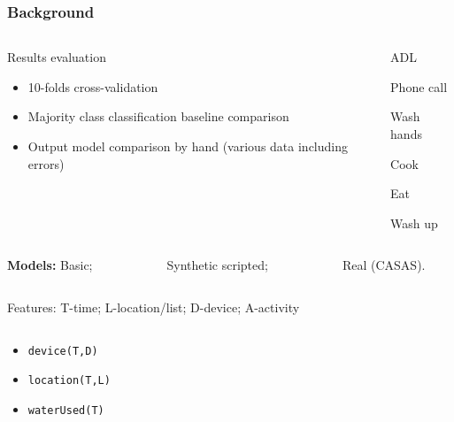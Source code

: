 \documentclass[10pt]{beamer}
\begin{document}
\begin{frame}
  \frametitle{Background}

  \begin{columns}
    \begin{column}{8cm}
      \begin{block}{Results evaluation}
      \begin{itemize}
        \item 10-folds cross-validation
        \item Majority class classification baseline comparison
        \item Output model comparison by hand (various data including errors)
      \end{itemize}
      \end{block}
    \end{column}

    \begin{column}{3cm}
      \begin{block}{ADL}
      \begin{itemize}
        \item Phone call
        \item Wash hands
        \item Cook {\setlength{\itemindent}{4em}\vspace*{-1.5em}\item Eat}
        \item Wash up
      \end{itemize}
      \end{block}
    \end{column}
  \end{columns}

\vspace*{0.5em}\textbf{Models:} Basic;~~~~~~~~~~~~Synthetic scripted;~~~~~~~~~~~~Real (CASAS).

  \begin{columns}

    \begin{column}{8cm}
      \begin{block}{Features: T-time; L-location/list; D-device; A-activity}

      \begin{columns}
        \hspace*{2em}\begin{column}{4cm}
        \begin{itemize}
          \item \texttt{device(T,D)}
          \item \texttt{location(T,L)}
          \item \texttt{waterUsed(T)}


\end{itemize}
\end{column}
\end{columns}
\end{block}
\end{column}
\end{columns}
\end{frame}
\end{document}
